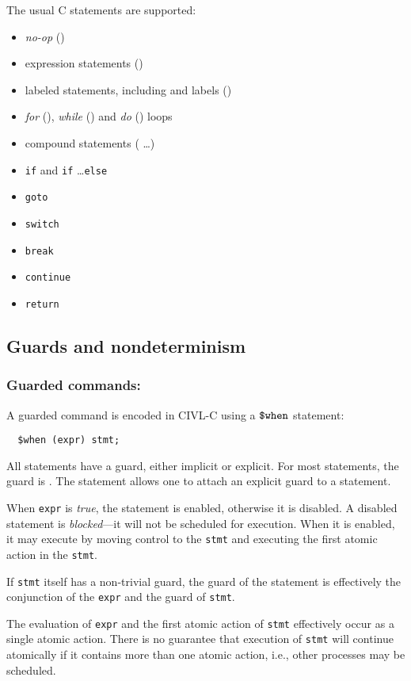 The usual C statements are supported:
\begin{itemize}
\item \emph{no-op} (\ct{;})
\item expression statements ()
\item labeled statements, including  and  labels
  ()
\item \emph{for} (), \emph{while} 
  () and \emph{do} ()
  loops
\item compound statements (\lb {} \ldots \rb)
\item \texttt{if} and \verb!if! \ldots \verb!else!
\item \verb!goto!
\item \verb!switch!
\item \verb!break!
\item \verb!continue!
\item \verb!return!
\end{itemize}

\subsection{Guards and nondeterminism}

\subsubsection{Guarded commands: \cwhen}

A guarded command is encoded in CIVL-C using a $\mbox{\texttt{\${}when}}$ statement:
\begin{verbatim}
  $when (expr) stmt;
\end{verbatim}
All statements have a guard, either implicit or explicit.  For most
statements, the guard is \ctrue.  The \cwhen{} statement allows one to
attach an explicit guard to a statement.

When \texttt{expr} is \emph{true}, the statement is enabled, otherwise
it is disabled.  A disabled statement is \emph{blocked}---it will not
be scheduled for execution.  When it is enabled, it may execute by
moving control to the \texttt{stmt} and executing the first atomic
action in the \texttt{stmt}.

If \texttt{stmt} itself has a non-trivial guard, the guard of the
\cwhen{} statement is effectively the conjunction of the \texttt{expr}
and the guard of \texttt{stmt}.

The evaluation of \texttt{expr} and the first atomic action of
\texttt{stmt} effectively occur as a single atomic action.  There is
no guarantee that execution of \texttt{stmt} will continue atomically
if it contains more than one atomic action, i.e., other processes may
be scheduled.

